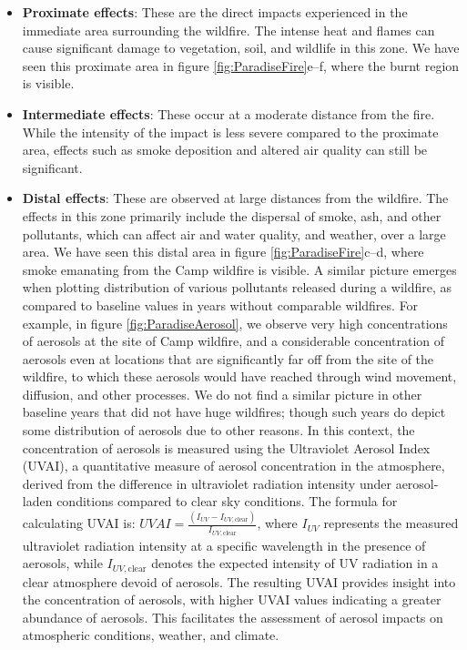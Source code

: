 \documentclass[
  12 pt,
]{Nemilov}
\providecommand{\tightlist}{%
  \setlength{\itemsep}{0pt}\setlength{\parskip}{0pt}}
\begin{document}
\begin{enumerate}
\begin{enumerate}
    \begin{itemize}
    \tightlist
    \item
      \textbf{Proximate effects}: These are the direct impacts experienced in the immediate area surrounding the wildfire. The intense heat and flames can cause significant damage to vegetation, soil, and wildlife in this zone. We have seen this proximate area in figure \ref{fig:ParadiseFire}e--f, where the burnt region is visible.
    \item
      \textbf{Intermediate effects}: These occur at a moderate distance from the fire. While the intensity of the impact is less severe compared to the proximate area, effects such as smoke deposition and altered air quality can still be significant.
    \item
      \textbf{Distal effects}: These are observed at large distances from the wildfire. The effects in this zone primarily include the dispersal of smoke, ash, and other pollutants, which can affect air and water quality, and weather, over a large area. We have seen this distal area in figure \ref{fig:ParadiseFire}c--d, where smoke emanating from the Camp wildfire is visible. A similar picture emerges when plotting distribution of various pollutants released during a wildfire, as compared to baseline values in years without comparable wildfires. For example, in figure \ref{fig:ParadiseAerosol}, we observe very high concentrations of aerosols at the site of Camp wildfire, and a considerable concentration of aerosols even at locations that are significantly far off from the site of the wildfire, to which these aerosols would have reached through wind movement, diffusion, and other processes. We do not find a similar picture in other baseline years that did not have huge wildfires; though such years do depict some distribution of aerosols due to other reasons. In this context, the concentration of aerosols is measured using the Ultraviolet Aerosol Index (UVAI), a quantitative measure of aerosol concentration in the atmosphere, derived from the difference in ultraviolet radiation intensity under aerosol-laden conditions compared to clear sky conditions. The formula for calculating UVAI is: \(UVAI = \frac{(I_{UV} - I_{UV, \text{clear}})}{I_{UV, \text{clear}}}\), where \(I_{UV}\) represents the measured ultraviolet radiation intensity at a specific wavelength in the presence of aerosols, while \(I_{UV, \text{clear}}\) denotes the expected intensity of UV radiation in a clear atmosphere devoid of aerosols. The resulting UVAI provides insight into the concentration of aerosols, with higher UVAI values indicating a greater abundance of aerosols. This facilitates the assessment of aerosol impacts on atmospheric conditions, weather, and climate.
    \end{itemize}
  \end{enumerate}
\end{enumerate}
\end{document}
